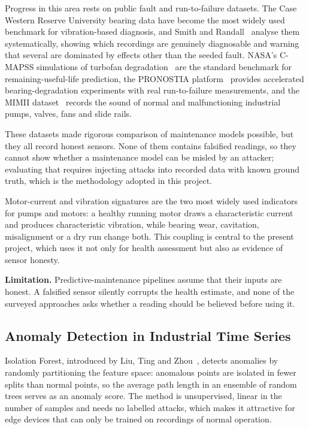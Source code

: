 Progress in this area rests on public fault and run-to-failure datasets. The Case Western Reserve University bearing data have become the most widely used benchmark for vibration-based diagnosis, and Smith and Randall~\cite{smith2015cwru} analyse them systematically, showing which recordings are genuinely diagnosable and warning that several are dominated by effects other than the seeded fault. NASA's C-MAPSS simulations of turbofan degradation~\cite{saxena2008cmapss} are the standard benchmark for remaining-useful-life prediction, the PRONOSTIA platform~\cite{nectoux2012pronostia} provides accelerated bearing-degradation experiments with real run-to-failure measurements, and the MIMII dataset~\cite{purohit2019mimii} records the sound of normal and malfunctioning industrial pumps, valves, fans and slide rails.

These datasets made rigorous comparison of maintenance models possible, but they all record honest sensors. None of them contains falsified readings, so they cannot show whether a maintenance model can be misled by an attacker; evaluating that requires injecting attacks into recorded data with known ground truth, which is the methodology adopted in this project.

Motor-current and vibration signatures are the two most widely used indicators for pumps and motors: a healthy running motor draws a characteristic current and produces characteristic vibration, while bearing wear, cavitation, misalignment or a dry run change both. This coupling is central to the present project, which uses it not only for health assessment but also as evidence of sensor honesty.

\textbf{Limitation.} Predictive-maintenance pipelines assume that their inputs are honest. A falsified sensor silently corrupts the health estimate, and none of the surveyed approaches asks whether a reading should be believed before using it.

\subsection{Anomaly Detection in Industrial Time Series}

Isolation Forest, introduced by Liu, Ting and Zhou~\cite{liu2008iforest}, detects anomalies by randomly partitioning the feature space: anomalous points are isolated in fewer splits than normal points, so the average path length in an ensemble of random trees serves as an anomaly score. The method is unsupervised, linear in the number of samples and needs no labelled attacks, which makes it attractive for edge devices that can only be trained on recordings of normal operation.

